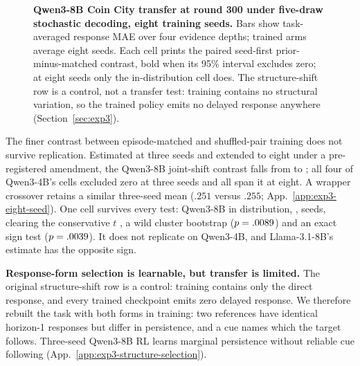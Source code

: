 \documentclass{article}
\begin{document}
\begin{figure}[!ht]
{%
}
\caption{\textbf{Qwen3-8B Coin City transfer at round 300 under five-draw
stochastic decoding, eight training seeds.} Bars show task-averaged response MAE
over four evidence depths; trained arms average eight seeds. Each cell prints the
paired seed-first prior-minus-matched contrast, bold when its 95\% interval
excludes zero; at eight seeds only the in-distribution cell does. The
structure-shift row is a control, not a transfer test: training contains no
structural variation, so the trained policy emits no delayed response anywhere
(Section~\ref{sec:exp3}).}
\label{fig:exp3-transfer-results}
\vspace{10pt}
\end{figure}

The finer contrast between episode-matched and shuffled-pair training does not
survive replication. Estimated at three seeds and extended to eight under a
pre-registered amendment, the Qwen3-8B joint-shift contrast falls from
\ePubEightJointEst{} \ePubEightJointCi{} to \eEightJointEst{} \eEightJointCi{};
all four of Qwen3-4B's cells excluded zero at three seeds and all span it at
eight. A wrapper crossover retains a similar three-seed mean ($.251$ versus $.255$;
App.~\ref{app:exp3-eight-seed}). One cell survives every test: Qwen3-8B in distribution,
\eEightIdEst{} \eEightIdCi{}, \eEightIdSign{} seeds, clearing the conservative
$t$ \eEightIdTci{}, a wild cluster bootstrap ($p=.0089{}$) and an exact
sign test ($p=.0039{}$). It does not replicate on Qwen3-4B, and
Llama-3.1-8B's estimate has the opposite sign.

\noindent\textbf{Response-form selection is learnable, but transfer is limited.}
The original structure-shift row is a control: training contains only the direct
response, and every trained checkpoint emits zero delayed response. We therefore
rebuilt the task with both forms in training: two references have identical
horizon-1 responses but differ in persistence, and a cue names which the target
follows. Three-seed Qwen3-8B RL learns marginal persistence without reliable cue
following (App.~\ref{app:exp3-structure-selection}).
\end{document}
